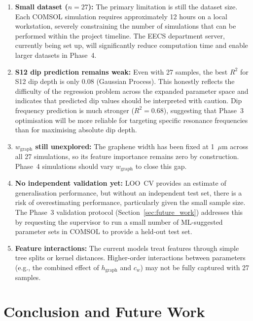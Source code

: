 \documentclass[12pt,a4paper]{report}
\begin{document}
\begin{enumerate}[leftmargin=2cm]
    \item \textbf{Small dataset ($n = 27$):} The primary limitation is still the dataset size. Each COMSOL simulation requires approximately 12 hours on a local workstation, severely constraining the number of simulations that can be performed within the project timeline. The EECS department server, currently being set up, will significantly reduce computation time and enable larger datasets in Phase~4.

    \item \textbf{S12 dip prediction remains weak:} Even with 27 samples, the best $R^2$ for S12 dip depth is only 0.08 (Gaussian Process). This honestly reflects the difficulty of the regression problem across the expanded parameter space and indicates that predicted dip values should be interpreted with caution. Dip frequency prediction is much stronger ($R^2 = 0.68$), suggesting that Phase~3 optimisation will be more reliable for targeting specific resonance frequencies than for maximising absolute dip depth.

    \item \textbf{$w_{\text{graph}}$ still unexplored:} The graphene width has been fixed at 1~$\mu$m across all 27 simulations, so its feature importance remains zero by construction. Phase~4 simulations should vary $w_{\text{graph}}$ to close this gap.

    \item \textbf{No independent validation yet:} LOO~CV provides an estimate of generalisation performance, but without an independent test set, there is a risk of overestimating performance, particularly given the small sample size. The Phase~3 validation protocol (Section~\ref{sec:future_work}) addresses this by requesting the supervisor to run a small number of ML-suggested parameter sets in COMSOL to provide a held-out test set.

    \item \textbf{Feature interactions:} The current models treat features through simple tree splits or kernel distances. Higher-order interactions between parameters (e.g., the combined effect of $h_{\text{graph}}$ and $c_w$) may not be fully captured with 27 samples.
\end{enumerate}


\chapter{Conclusion and Future Work}
\label{ch:conclusion}
\end{document}
